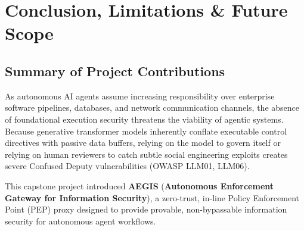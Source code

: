\chapter{Conclusion, Limitations \& Future Scope}
\label{chap:conclusion}

\section{Summary of Project Contributions}
As autonomous AI agents assume increasing responsibility over enterprise software pipelines, databases, and network communication channels, the absence of foundational execution security threatens the viability of agentic systems. Because generative transformer models inherently conflate executable control directives with passive data buffers, relying on the model to govern itself or relying on human reviewers to catch subtle social engineering exploits creates severe Confused Deputy vulnerabilities (OWASP LLM01, LLM06).

This capstone project introduced \textbf{AEGIS} (\textbf{Autonomous Enforcement Gateway for Information Security}), a zero-trust, in-line Policy Enforcement Point (PEP) proxy designed to provide provable, non-bypassable information security for autonomous agent workflows. 

